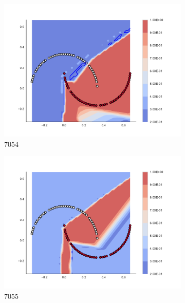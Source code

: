 \begin{figure}[h]
\begin{subfigure}[b]{0.09\textwidth}
    \includegraphics[clip, trim=2.35cm 1.75cm 4.5cm 0cm,width=\textwidth]{img/convergence/7054.pdf}
    \caption{7054}
    \label{fig:convergence_7054}
\end{subfigure}
%
\begin{subfigure}[b]{0.09\textwidth}
    \includegraphics[clip, trim=2.35cm 1.75cm 4.5cm 0cm,width=\textwidth]{img/convergence/7055.pdf}
    \caption{7055}
    \label{fig:convergence_7055}
\end{subfigure}
%
\begin{subfigure}[b]{0.09\textwidth}

\end{subfigure}
\end{figure}
